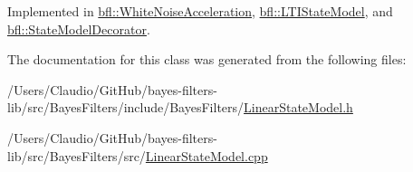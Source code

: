 Implemented in \mbox{\hyperlink{classbfl_1_1WhiteNoiseAcceleration_a0203b47074e0680852f53dcba8a7a627}{bfl\+::\+White\+Noise\+Acceleration}}, \mbox{\hyperlink{classbfl_1_1LTIStateModel_afc2264780111fe41b6a82e97bcb5e87c}{bfl\+::\+L\+T\+I\+State\+Model}}, and \mbox{\hyperlink{classbfl_1_1StateModelDecorator_ad292f3b665c1adf20a1f32dc8a065fec}{bfl\+::\+State\+Model\+Decorator}}.



The documentation for this class was generated from the following files\+:\begin{DoxyCompactItemize}
\item 
/\+Users/\+Claudio/\+Git\+Hub/bayes-\/filters-\/lib/src/\+Bayes\+Filters/include/\+Bayes\+Filters/\mbox{\hyperlink{LinearStateModel_8h}{Linear\+State\+Model.\+h}}\item 
/\+Users/\+Claudio/\+Git\+Hub/bayes-\/filters-\/lib/src/\+Bayes\+Filters/src/\mbox{\hyperlink{LinearStateModel_8cpp}{Linear\+State\+Model.\+cpp}}\end{DoxyCompactItemize}
